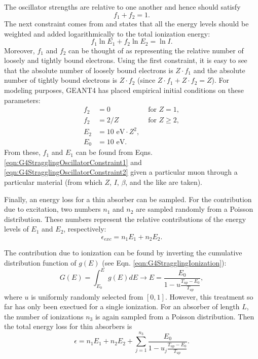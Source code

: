 The oscillator strengths are relative to one another and hence should satisfy
\begin{equation}\label{eqn:G4StragglingOscillatorConstraint1}
f_1+f_2=1.
\end{equation}
The next constraint comes from \cite{bichsel1988} and states that all the energy levels should be weighted and added logarithmically to the total ionization energy:
\begin{equation}\label{eqn:G4StragglingOscillatorConstraint2}
f_1 \ln E_1 + f_2 \ln E_2 = \ln I.
\end{equation}
Moreover, $f_1$ and $f_2$ can be thought of as representing the relative number of loosely and tightly bound electrons. Using the first constraint, it is easy to see that the absolute number of loosely bound electrons is $Z\cdot f_1$ and the absolute number of tightly bound electrons is $Z\cdot f_2$ (since $Z\cdot f_1+Z\cdot f_2=Z$). For modeling purposes, GEANT4 has placed empirical initial conditions on these parameters:
\begin{align} \label{eqn:G4StragglingOscillatorConstraint3}
f_2 & = 0 & \text{   for   } Z=1,\\
f_2 & = 2/Z & \text{     for     } Z\ge 2,\\
E_2 & = 10 \text{ eV}\cdot Z^2,\\
E_0 &= 10 \text{ eV}.
\end{align}
From these, $f_1$ and $E_1$ can be found from Eqns. \ref{eqn:G4StragglingOscillatorConstraint1} and \ref{eqn:G4StragglingOscillatorConstraint2} given a particular muon through a particular material (from which $Z$, $I$, $\beta$, and the like are taken).

Finally, an energy loss for a thin absorber can be sampled. For the contribution due to excitation, two numbers $n_1$ and $n_2$ are sampled randomly from a Poisson distribution. These numbers represent the relative contributions of the energy levels of $E_1$ and $E_2$, respectively:
\begin{equation}\nonumber
\epsilon_{exc}=n_1 E_1 + n_2 E_2.
\end{equation}

The contribution due to ionization can be found by inverting the cumulative distribution function of $g(E)$ (see Eqn. \ref{eqn:G4StragglingIonization}):
\begin{equation}\nonumber
G(E)=\int_{E_0}^E g(E) dE \rightarrow E=\frac{E_0}{1-u\frac{T_{up}-E_0}{T_{up}}},
\end{equation}
where $u$ is uniformly randomly selected from $[0,1]$. However, this treatment so far has only been exectued for a single ionization. For an absorber of length $L$, the number of ionizations $n_3$ is again sampled from a Poisson distribution. Then the total energy loss for thin absorbers is
\begin{equation}\label{G4StragglingThin}
\epsilon = n_1 E_1 + n_2 E_2 + \sum_{j=1}^{n_3} \frac{E_0}{1-u_j \frac{T_{up}-E_0}{T_{up}}}.
\end{equation}

